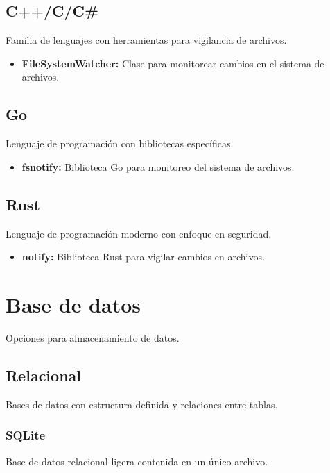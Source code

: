 \subsection{C++/C/C\#}
Familia de lenguajes con herramientas para vigilancia de archivos.

\begin{itemize}
    \item \textbf{FileSystemWatcher:} Clase para monitorear cambios en el sistema de archivos.
\end{itemize}

\subsection{Go}
Lenguaje de programación con bibliotecas específicas.

\begin{itemize}
    \item \textbf{fsnotify:} Biblioteca Go para monitoreo del sistema de archivos.
\end{itemize}

\subsection{Rust}
Lenguaje de programación moderno con enfoque en seguridad.

\begin{itemize}
    \item \textbf{notify:} Biblioteca Rust para vigilar cambios en archivos.
\end{itemize}

\clearpage
\section{Base de datos}
Opciones para almacenamiento de datos.

\subsection{Relacional}
Bases de datos con estructura definida y relaciones entre tablas.

\subsubsection{SQLite}
Base de datos relacional ligera contenida en un único archivo.

